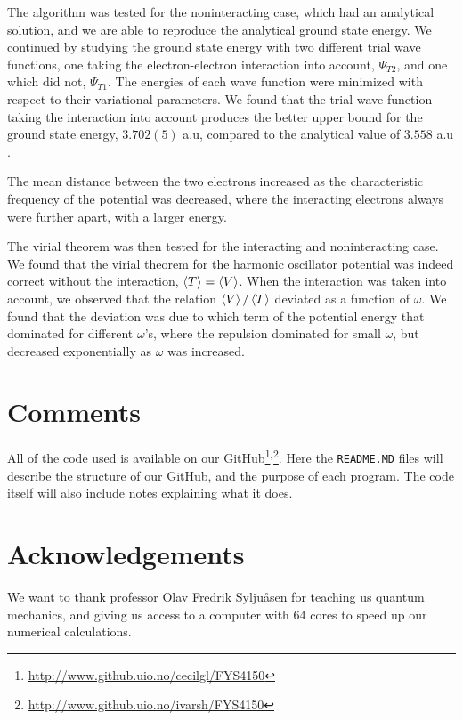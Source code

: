 \documentclass[%
 reprint,
nofootinbib,
aps,
]{revtex4-1}
\begin{document}
The algorithm was tested for the noninteracting case, which had an analytical solution, and we are able to reproduce the analytical ground state energy. We continued by studying the ground state energy with two different trial wave functions, one taking the electron-electron interaction into account, $\Psi_{T2}$, and one which did not, $\Psi_{T1}$. The energies of each wave function were minimized with respect to their variational parameters. We found that the trial wave function taking the interaction into account produces the better upper bound for the ground state energy, $3.702(5)$ a.u, compared to the analytical value of $3.558$ a.u \cite{Hjorten}.

The mean distance between the two electrons increased as the characteristic frequency of the potential was decreased, where the interacting electrons always were further apart, with a larger energy.

The virial theorem was then tested for the interacting and noninteracting case. We found that the virial theorem for the harmonic oscillator potential was indeed correct without the interaction, $\ev{T} = \ev{V}$. When the interaction was taken into account, we observed that the relation $\ev{V}/\ev{T}$ deviated as a function of $\omega$. We found that the deviation was due to which term of the potential energy that dominated for different $\omega$'s, where the repulsion dominated for small $\omega$, but decreased exponentially as $\omega$ was increased.

\section{Comments}
All of the code used is available on our GitHub\footnote{\url{http://www.github.uio.no/cecilgl/FYS4150}}${}^{,}$\footnote{\url{http://www.github.uio.no/ivarsh/FYS4150}}. Here the \texttt{README.MD} files will describe the structure of our GitHub, and the purpose of each program. The code itself will also include notes explaining what it does.

\section{Acknowledgements}
We want to thank professor Olav Fredrik Syljuåsen for teaching us quantum mechanics, and giving us access to a computer with $64$ cores to speed up our numerical calculations.



\newpage
\onecolumngrid
\appendix
\end{document}
